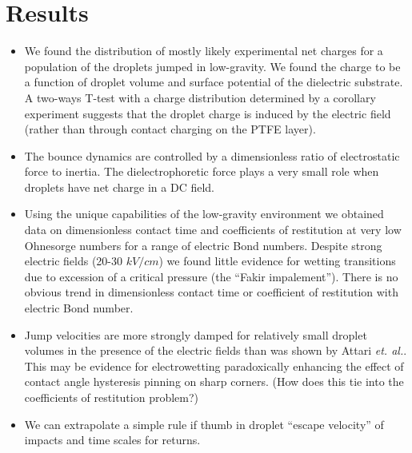 \documentclass[a4paper, 12pt]{article}
\begin{document}
\section{Results}
\begin{itemize}
\item We found the distribution of mostly likely experimental net charges for a population of the droplets jumped in low-gravity. We found the charge to be a function of droplet volume and surface potential of the dielectric substrate. A two-ways T-test with a charge distribution determined by a corollary experiment suggests that the droplet charge is induced by the electric field (rather than through contact charging on the PTFE layer).

\item The bounce dynamics are controlled by a dimensionless ratio of electrostatic force to inertia. The dielectrophoretic force plays a very small role when droplets have net charge in a DC field.  

\item Using the unique capabilities of the low-gravity environment we obtained data on dimensionless contact time and coefficients of restitution at very low Ohnesorge numbers for a range of electric Bond numbers. Despite strong electric fields (20-30 $kV/cm$) we found little evidence for wetting transitions due to excession of a critical pressure (the ``Fakir impalement''). There is no obvious trend in dimensionless contact time or coefficient of restitution with electric Bond number.

\item Jump velocities are more strongly damped for relatively small droplet volumes in the presence of the electric fields than was shown by Attari \emph{et. al.}. This may be evidence for electrowetting paradoxically enhancing the effect of contact angle hysteresis pinning on sharp corners. (How does this tie into the coefficients of restitution problem?)

\item We can extrapolate a simple rule if thumb in droplet ``escape velocity'' of impacts and time scales for returns.

\end{itemize} 
\end{document}
